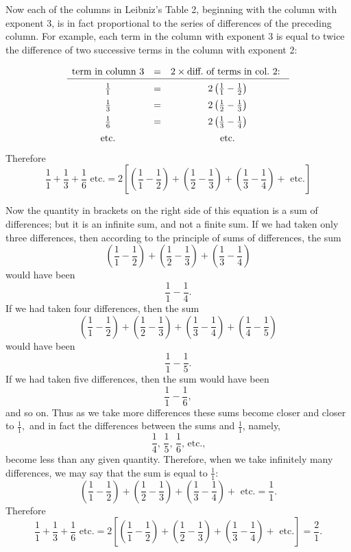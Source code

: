 \documentclass[twoside,openright]{article}
\begin{document}
Now each of the columns in Leibniz's Table 2, beginning with the column with exponent 3, is in fact proportional to the series of differences of the preceding column.  For example, each term in the column with exponent 3 is equal to twice the difference of two successive terms in the column with exponent 2:
$$\begin{array}{ccc}
\rule[-1ex]{0ex}{4ex}\mbox{term in column 3} &  = & 2\times \mbox{diff.\ of terms in col.\ 2: }\\ \hline
\rule[-1ex]{0ex}{4ex}\frac{1}{1}  & = &  2\left(\frac{1}{1}- \frac{1}{2}\right)  \\
\rule[-1ex]{0ex}{4ex}\frac{1}{3}  & = &  2\left(\frac{1}{2}- \frac{1}{3}\right) \\
\rule[-1ex]{0ex}{4ex}\frac{1}{6}  & = &  2\left(\frac{1}{3}- \frac{1}{4}\right) \\
\rule[-1ex]{0ex}{4ex}\mbox{etc.} & & \mbox{etc.}
\end{array}$$
 Therefore
$$\frac{1}{1} + \frac{1}{3} + \frac{1}{6} \mbox{ etc.} = 2\left[\left(\frac{1}{1} - \frac{1}{2}\right) + \left(\frac{1}{2} - \frac{1}{3}\right) + \left(\frac{1}{3} -\frac{1}{4}\right) + \mbox{ etc.}\right]$$

Now the quantity in brackets on the right side of this equation is a sum of differences; but it is an infinite sum, and not a finite sum.    If we had taken only three differences, then according to the principle of sums of differences, the sum
 $$\left(\frac{1}{1} - \frac{1}{2}\right) + \left(\frac{1}{2} - \frac{1}{3}\right) + \left(\frac{1}{3} -\frac{1}{4}\right)$$
 would have been
 $$\frac{1}{1} - \frac{1}{4}.$$
 If we had taken four differences, then the sum
 $$\left(\frac{1}{1} - \frac{1}{2}\right) + \left(\frac{1}{2} - \frac{1}{3}\right) + \left(\frac{1}{3} -\frac{1}{4}\right) + \left(\frac{1}{4} - \frac{1}{5}\right)$$
 would have been
 $$\frac{1}{1} -\frac{1}{5}.$$
 If we had taken five differences, then the sum would have been 
 $$\frac{1}{1} - \frac{1}{6},$$
 and so on.  Thus as we take more differences these sums become closer and closer to 
 $\frac{1}{1},$
 and in fact the differences  between the sums and $\frac{1}{1}$, namely,
 $$\frac{1}{4}\mbox{, }\frac{1}{5}\mbox{, }\frac{1}{6} \mbox{, etc.,}$$
 become less than any given quantity. Therefore, when we take infinitely many differences, we may say that the sum is equal to $\frac{1}{1}$:
 $$ \left(\frac{1}{1} - \frac{1}{2}\right) + \left(\frac{1}{2} - \frac{1}{3}\right) + \left(\frac{1}{3} -\frac{1}{4}\right) +\mbox{ etc.} = \frac{1}{1}.$$
  Therefore
$$\frac{1}{1} + \frac{1}{3} + \frac{1}{6} \mbox{ etc.}= 2\left[\left(\frac{1}{1} - \frac{1}{2}\right) + \left(\frac{1}{2} - \frac{1}{3}\right) + \left(\frac{1}{3} -\frac{1}{4}\right) + \mbox{ etc.}\right]= \frac{2}{1}.$$\label{endsersum}
\end{document}
